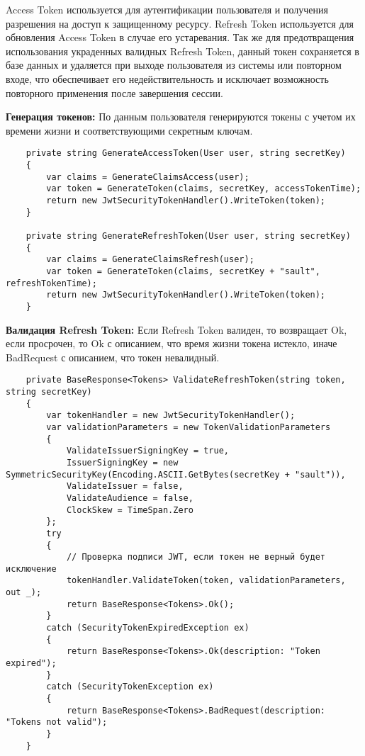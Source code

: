 Access Token используется для аутентификации пользователя и получения разрешения на доступ к защищенному ресурсу. Refresh Token используется для обновления Access Token в случае его устаревания. Так же для предотвращения использования украденных валидных Refresh Token, данный токен сохраняется в базе данных и удаляется при выходе пользователя из системы или повторном входе, что обеспечивает его недействительность и исключает возможность повторного применения после завершения сессии.

\textbf{Генерация токенов:} По данным пользователя генерируются токены с учетом их времени жизни и соответствующими секретным ключам.
\begin{verbatim}
    private string GenerateAccessToken(User user, string secretKey)
    {
        var claims = GenerateClaimsAccess(user);
        var token = GenerateToken(claims, secretKey, accessTokenTime);
        return new JwtSecurityTokenHandler().WriteToken(token);
    }

    private string GenerateRefreshToken(User user, string secretKey)
    {
        var claims = GenerateClaimsRefresh(user);
        var token = GenerateToken(claims, secretKey + "sault", refreshTokenTime);
        return new JwtSecurityTokenHandler().WriteToken(token);
    }
\end{verbatim}

\textbf{Валидация Refresh Token:} Если Refresh Token валиден, то возвращает Ok, если просрочен, то Ok с описанием, что время жизни токена истекло, иначе BadRequest с описанием, что токен невалидный.
\begin{verbatim}
    private BaseResponse<Tokens> ValidateRefreshToken(string token, string secretKey)
    {
        var tokenHandler = new JwtSecurityTokenHandler();
        var validationParameters = new TokenValidationParameters
        {
            ValidateIssuerSigningKey = true,
            IssuerSigningKey = new SymmetricSecurityKey(Encoding.ASCII.GetBytes(secretKey + "sault")),
            ValidateIssuer = false,
            ValidateAudience = false,
            ClockSkew = TimeSpan.Zero
        };
        try
        {
            // Проверка подписи JWT, если токен не верный будет исключение
            tokenHandler.ValidateToken(token, validationParameters, out _);
            return BaseResponse<Tokens>.Ok();
        }
        catch (SecurityTokenExpiredException ex)
        {
            return BaseResponse<Tokens>.Ok(description: "Token expired");
        }
        catch (SecurityTokenException ex)
        {
            return BaseResponse<Tokens>.BadRequest(description: "Tokens not valid");
        }
    }
\end{verbatim}

